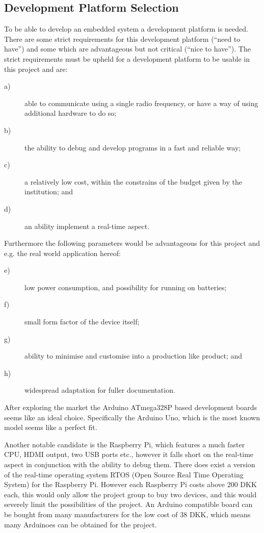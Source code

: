
\subsection{Development Platform Selection}
To be able to develop an embedded system a development platform is needed. 
There are some strict requirements for this development platform (``need to have'') and some which are advantageous but not critical (``nice to have'').
The strict requirements must be upheld for a development platform to be usable in this project and are:
\begin{description}
\item[a)] able to communicate using a single radio frequency, or have a way of using additional hardware to do so;
\item[b)] the ability to debug and develop programs in a fast and reliable way;
\item[c)] a relatively low cost, within the constrains of the budget given by the institution;
and
\item[d)] an ability implement a real-time aspect.
\end{description}

Furthermore the following parameters would be advantageous for this project and e.g. the real world application hereof:
\begin{description}
\item[e)] low power consumption, and possibility for running on batteries;
\item[f)] small form factor of the device itself;
\item[g)] ability to minimise and customise into a production like product;
and
\item[h)] widespread adaptation for fuller documentation.
\end{description}

After exploring the market the Arduino ATmega328P based development boards seems like an ideal choice.
Specifically the Arduino Uno, which is the most known model seems like a perfect fit.

Another notable candidate is the Raspberry Pi, which features a much faster CPU, HDMI output, two USB ports etc., however it falls short on the real-time aspect in conjunction with the ability to debug them. 
There does exist a version of the real-time operating system RTOS (Open Source Real Time Operating System) for the Raspberry Pi.
However each Raspberry Pi costs above 200 DKK each, this would only allow the project group to buy two devices, and this would severely limit the possibilities of the project.
An Arduino compatible board can be bought from many manufacturers for the low cost of 38 DKK, which means many Arduinoes can be obtained for the project.

